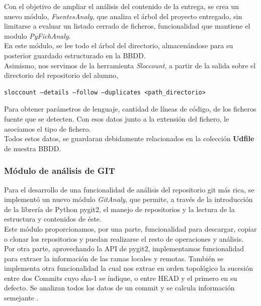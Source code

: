 Con el objetivo de ampliar el análisis del contenido de la entrega, se crea un nuevo módulo, \textit{FuentesAnaly}, que analiza el árbol del proyecto entregado, sin limitarse a evaluar un listado cerrado de ficheros, funcionalidad que mantiene el modulo \textit{PyFichAnaly}.\\


En este módulo, se lee todo el árbol del directorio, almacenándose para su posterior guardado estructurado en la BBDD.\\


Asimismo, nos servimos de la herramienta \textit{Sloccount}, a partir de la salida sobre el directorio del repositorio del alumno,

\begin{center}
\begin{verbatim}
sloccount –details –follow –duplicates <path_directorio>
\end{verbatim}
\end{center}

Para obtener parámetros de lenguaje, cantidad de líneas de código, de los ficheros fuente que se detecten. Con esos datos junto a la extensión del fichero, le asociamos el tipo de fichero.\\


Todos estos datos, se guardaran debidamente relacionados en la colección \textbf{Udfile} de nuestra BBDD.\\

\subsubsection{Módulo de análisis de GIT} 
\label{subsec:mod_anal_git}

Para el desarrollo de una funcionalidad de análisis del repositorio git más rica, se implementó un nuevo módulo \textit{GitAnaly}, que permite, a través de la introducción de la librería de Python pygit2, el manejo de repositorios y la lectura de la estructura y contenidos de éste.\\


Este módulo proporcionamos, por una parte, funcionalidad para descargar, copiar o clonar los repositorios y puedan realizarse el resto de operaciones y análisis.\\


Por otra parte, aprovechando la API de pygit2, implementamos funcionalidad para extraer la información de las ramas locales y remotas. También se implementa otra funcionalidad la cual nos extrae en orden topológico la sucesión entre dos Commits cuyo sha-1 se índique, o entre HEAD y el primero en su defecto. Se analizan todos los datos de un commit y se calcula información semejante .\\


